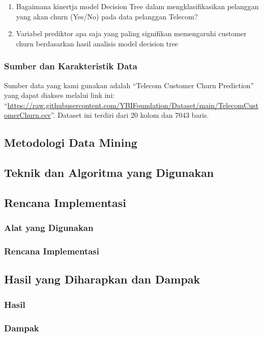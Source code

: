 \documentclass[11pt,]{article}
\begin{document}
\begin{enumerate}
\def\labelenumi{\arabic{enumi}.}
\item
  Bagaimana kinertja model Decision Tree dalam mengklasifikasikan
  pelanggan yang akan churn (Yes/No) pada data pelanggan Telecom?
\item
  Variabel prediktor apa saja yang paling signifikan memengaruhi
  customer churn berdasarkan hasil analisis model decision tree
\end{enumerate}

\subsubsection{Sumber dan Karakteristik
Data}\label{sumber-dan-karakteristik-data}

Sumber data yang kami gunakan adalah ``Telecom Customer Churn
Prediction'' yang dapat diakses melalui link ini:
``\url{https://raw.githubusercontent.com/YBIFoundation/Dataset/main/TelecomCustomerChurn.csv}''.
Dataset ini terdiri dari 20 kolom dan 7043 baris.

\subsection{Metodologi Data Mining}\label{metodologi-data-mining}

\subsection{Teknik dan Algoritma yang
Digunakan}\label{teknik-dan-algoritma-yang-digunakan}

\subsection{Rencana Implementasi}\label{rencana-implementasi}

\subsubsection{Alat yang Digunakan}\label{alat-yang-digunakan}

\subsubsection{Rencana Implementasi}\label{rencana-implementasi-1}

\subsection{Hasil yang Diharapkan dan
Dampak}\label{hasil-yang-diharapkan-dan-dampak}

\subsubsection{Hasil}\label{hasil}

\subsubsection{Dampak}\label{dampak}

\subsection{}\label{section}

\nocite{*}


\end{document}
